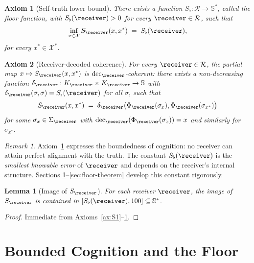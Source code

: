 \documentclass[11pt,a4paper]{article}
\theoremstyle{thmstyle}
\newtheorem{lemma}[theorem]{Lemma}
\theoremstyle{thmstyle}
\newtheorem{axiom}{Axiom}
\theoremstyle{definition}
\theoremstyle{remark}
\newtheorem{remark}[theorem]{Remark}
\DeclareMathOperator{\dec}{dec}
\newcommand{\Sscale}{\mathbb{S}}
\newcommand{\Receiver}{\mathcal{R}}
\newcommand{\Cands}{\mathcal{X}}
\newcommand{\Truth}{\mathcal{X}^{*}}
\newcommand{\Sscalar}{S}
\newcommand{\Sfloor}{S_{\flat}}
\begin{document}
\begin{axiom}[Self-truth lower bound]\label{ax:S3}
There exists a function $\Sfloor : \Receiver \to \Sscale^{*}$,
called the \emph{floor function}, with
$\Sfloor(\receiver) > 0$ for every $\receiver \in \Receiver$,
such that
\[
\inf_{x \in \Cands} \Sscalar_{\receiver}(x, x^{*})
   \;=\; \Sfloor(\receiver),
\]
for every $x^{*} \in \Truth$.
\end{axiom}

\begin{axiom}[Receiver-decoded coherence]\label{ax:S4}
For every $\receiver \in \Receiver$, the partial map
$x \mapsto \Sscalar_{\receiver}(x, x^{*})$ is
$\dec_{\receiver}$-coherent: there exists a
non-decreasing function
$\delta_{\receiver}: K_{\receiver} \times K_{\receiver}
   \to \Sscale$
with $\delta_{\receiver}(\sigma,\sigma) = \Sfloor(\receiver)$
for all $\sigma$, such that
\[
\Sscalar_{\receiver}(x, x^{*})
\;=\; \delta_{\receiver}\bigl(\Phi_{\receiver}(\sigma_{x}),
                              \Phi_{\receiver}(\sigma_{x^{*}})\bigr)
\]
for some $\sigma_{x} \in \Sigma_{\receiver}$
with $\dec_{\receiver}(\Phi_{\receiver}(\sigma_{x})) = x$
and similarly for $\sigma_{x^{*}}$.
\end{axiom}

\begin{remark}\label{rem:why-axiom-3}
Axiom~\ref{ax:S3} expresses the boundedness of cognition:
no receiver can attain perfect alignment with the truth.
The constant $\Sfloor(\receiver)$ is the
\emph{smallest knowable error} of $\receiver$ and depends
on the receiver's internal structure. Sections
\ref{sec:bounded-cognition}--\ref{sec:floor-theorem}
develop this constant rigorously.
\end{remark}

\begin{lemma}[Image of $\Sscalar_{\receiver}$]\label{lem:image-S}
For each receiver $\receiver$, the image of
$\Sscalar_{\receiver}$ is contained in
$[\Sfloor(\receiver), 100] \subseteq \Sscale^{*}$.
\end{lemma}

\begin{proof}
Immediate from Axioms~\ref{ax:S1}--\ref{ax:S3}.
\end{proof}

\section{Bounded Cognition and the Floor}
\label{sec:bounded-cognition}
\end{document}
